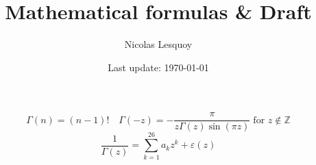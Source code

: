 \documentclass[12pt, a4paper]{article}
\title{Mathematical formulas \& Draft}
\author{Nicolas Lesquoy}
\date{Last update: \today}
\begin{document}
\maketitle

\begin{equation}
    \Gamma(n) = (n-1)!\quad \Gamma(-z) = -\frac{\pi}{z\Gamma(z)\sin(\pi z)}\; \text{for } z \notin \mathbb{Z}
\end{equation}
\begin{equation}
    \frac{1}{\Gamma(z)} = \sum_{k=1}^{26}a_k z^k + \varepsilon(z)
\end{equation}
\end{document}
